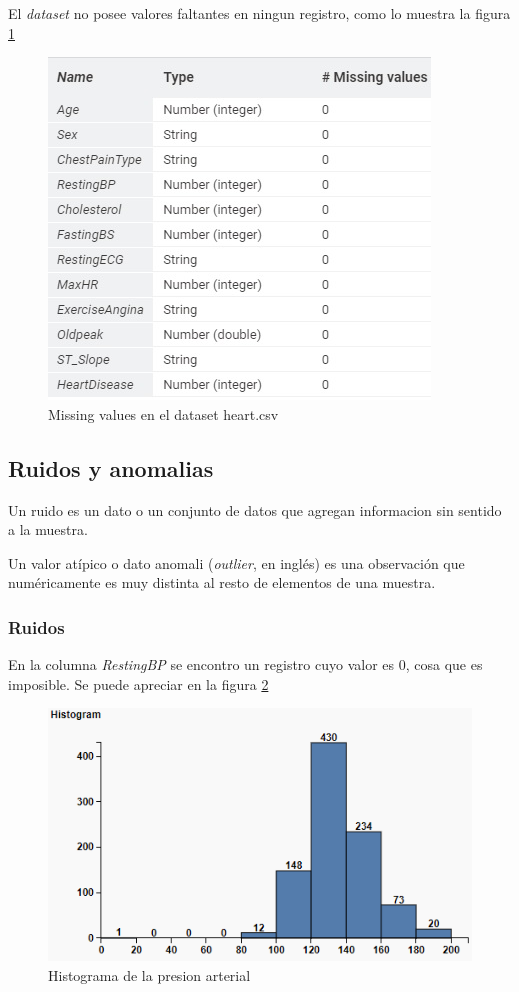 \documentclass[12pt, letterpaper]{article}
\begin{document}
El \textit{dataset} no posee valores faltantes en ningun registro, como lo muestra la figura
\ref{fig:missing_values}
\begin{figure}
    \centering
    \includegraphics[scale=1]{missing_values.jpg}
    \caption{Missing values en el dataset heart.csv}
    \label{fig:missing_values}
\end{figure}
\newpage
\subsection{Ruidos y anomalias}

Un ruido es un dato o un conjunto de datos que agregan informacion sin sentido a la muestra.
\cite{ruido}

Un valor atípico o dato anomali (\textit{outlier}, en inglés) 
es una observación que numéricamente es muy distinta al resto de elementos de una muestra.
\cite{anomalia}

\subsubsection{Ruidos}
En la columna \textit{RestingBP} se encontro un registro cuyo valor es 0, cosa que es imposible.
Se puede apreciar en la figura \ref{fig:presion-arterial}

\begin{figure}
    \centering
    \includegraphics[scale=1]{RestingBP.png}
    \caption{Histograma de la presion arterial}
    \label{fig:presion-arterial}
\end{figure}
\end{document}

